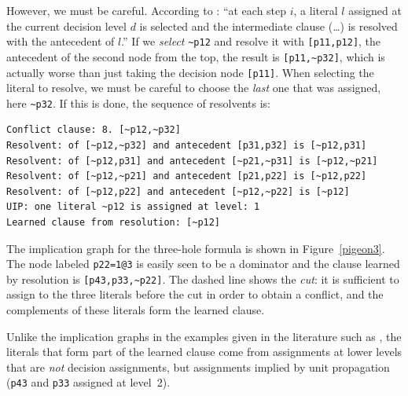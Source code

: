 \documentclass[11pt]{report}
\begin{document}
However, we must be careful. According to \cite[p.~137]{mlm}: ``at each
step $i$, a literal $l$ assigned at the current decision level $d$ is
selected and the intermediate clause (\ldots) is resolved with the
antecedent of $l$.'' If we \emph{select} \verb+~p12+ and resolve it with
\verb+[p11,p12]+, the antecedent of the second node from the top, the
result is \verb+[p11,~p32]+, which is actually worse than just taking
the decision node \verb+[p11]+. When selecting the literal to resolve,
we must be careful to choose the \emph{last} one that was assigned, here
\verb+~p32+. If this is done, the sequence of resolvents is:

\begin{verbatim}
Conflict clause: 8. [~p12,~p32]
Resolvent: of [~p12,~p32] and antecedent [p31,p32] is [~p12,p31]
Resolvent: of [~p12,p31] and antecedent [~p21,~p31] is [~p12,~p21]
Resolvent: of [~p12,~p21] and antecedent [p21,p22] is [~p12,p22]
Resolvent: of [~p12,p22] and antecedent [~p12,~p22] is [~p12]
UIP: one literal ~p12 is assigned at level: 1
Learned clause from resolution: [~p12]
\end{verbatim}

The implication graph for the three-hole formula is shown in
Figure~\ref{pigeon3}.
The node labeled \verb+p22=1@3+ is easily seen to be a dominator and the
clause learned by resolution is \verb+[p43,p33,~p22]+. The dashed line
shows the \emph{cut}: it is sufficient to assign to the three literals
before the cut in order to obtain a conflict, and the complements of
these literals form the learned clause.

Unlike the implication graphs in the examples given in the literature
such as \cite{mlm}, the literals that form part of the learned clause
come from assignments at lower levels that are \emph{not} decision
assignments, but assignments implied by unit propagation (\verb+p43+ and
\verb+p33+ assigned at level~2).
\end{document}
